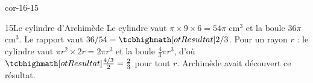 \begin{blocLivre}{cor-16-15}\begin{corrige}{15}{Le cylindre d’Archimède}
Le cylindre vaut $\pi\times9\times6=54\pi$ cm$^3$ et la boule $36\pi$ cm$^3$. Le rapport vaut $36/54=\res{2/3}$. Pour un rayon $r$ : le cylindre vaut $\pi r^2\times2r=2\pi r^3$ et la boule $\frac43\pi r^3$, d’où $\res{\frac{4/3}{2}=\frac23}$ pour tout $r$. Archimède avait découvert ce résultat.
\label{fig-cor-16-15}
\end{corrige}\end{blocLivre}
